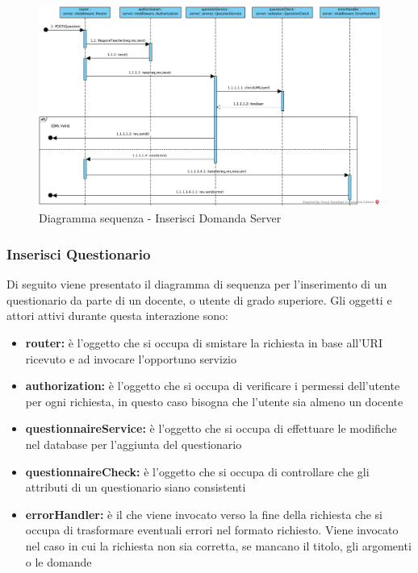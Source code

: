 \documentclass[12pt,a4paper]{article}
\begin{document}
\begin{center}
	\begin{figure}[H]
		\centering \includegraphics[max width=\myheight, angle=90]{../img/diagrammiSequenza/inserisciDomandaServer.png}
		\caption{Diagramma sequenza - Inserisci Domanda Server}
	\end{figure}
\end{center}

\newpage
\subsubsection{Inserisci Questionario}
Di seguito viene presentato il diagramma di sequenza per l'inserimento di un questionario da parte di un docente, o utente di grado superiore. Gli oggetti e attori attivi durante questa interazione sono:

\begin{itemize}
	\item \textbf{router:} è l'oggetto che si occupa di smistare la richiesta in base all’URI ricevuto e ad invocare l’opportuno servizio
	\item \textbf{authorization:} è l'oggetto che si occupa di verificare i permessi dell'utente per ogni richiesta, in questo caso bisogna che l'utente sia almeno un docente
	\item \textbf{questionnaireService:} è l'oggetto che si occupa di effettuare le modifiche nel database per l'aggiunta del questionario
	\item \textbf{questionnaireCheck:} è l'oggetto che si occupa di controllare che gli attributi di un questionario siano consistenti
	\item \textbf{errorHandler:} è il  che viene invocato verso la fine della richiesta che si occupa di trasformare eventuali errori nel formato  richiesto. Viene invocato nel caso in cui la richiesta non sia corretta, se mancano il titolo, gli argomenti o le domande
\end{itemize}
\end{document}
